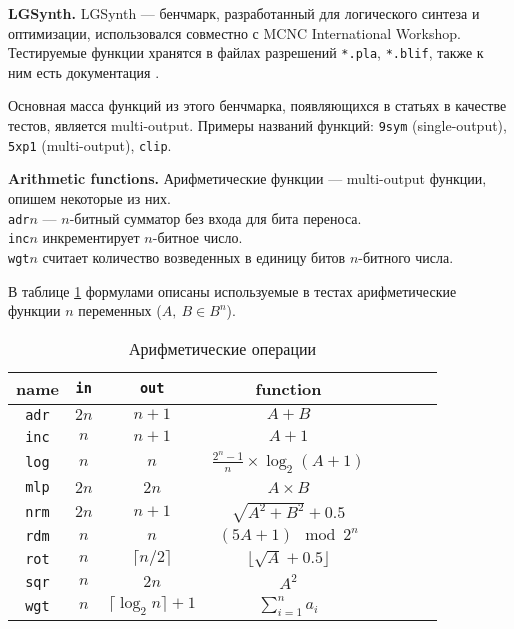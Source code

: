\documentclass[a4paper,12pt,titlepage,finall]{article}
\begin{document}
\textbf{LGSynth.}
LGSynth --- бенчмарк, разработанный для логического синтеза и оптимизации, использовался совместно с MCNC International Workshop. Тестируемые функции хранятся в файлах разрешений \texttt{*.pla}, \texttt{*.blif}, также к ним есть документация \cite{benchmark}.

Основная масса функций из этого бенчмарка, появляющихся в статьях в качестве тестов, является multi-output. Примеры названий функций: \texttt{9sym} (single-output), \texttt{5xp1} (multi-output), \texttt{clip}.

\textbf{Arithmetic functions.}
Арифметические функции --- multi-output функции, опишем некоторые из них.\\
\texttt{adr}$ n $ --- $ n $-битный сумматор без входа для бита переноса.\\
\texttt{inc}$ n $ инкрементирует $ n $-битное число.\\
\texttt{wgt}$ n $ считает количество возведенных в единицу битов $ n $-битного числа.

В таблице \ref{table_arithmetic} формулами описаны используемые в тестах арифметические функции $ n $ переменных ($ A,\ B \in B^n $).

\begin{table}[h!]
\centering
\begin{tabular}{ |c||c|c||c|c|c|c|c| }
\hline
\textbf{name}   & \texttt{\bf in} & \texttt{\bf out}    & \textbf{function} \\
\hline\hline
\texttt{adr} & $ 2 n $ & $ n + 1 $                      & $ A + B $ \\
\hline
\texttt{inc} & $ n $   & $ n + 1 $                      & $ A + 1 $ \\
\hline
\texttt{log} & $ n $   & $ n $                          & $ \frac{2^n - 1}{n} \times \log_2 (A + 1) $ \\
\hline
\texttt{mlp} & $ 2 n $ & $ 2 n $                        & $ A \times B $ \\
\hline
\texttt{nrm} & $ 2 n $ & $ n + 1 $                      & $ \sqrt{A^2 + B^2} + 0.5 $ \\
\hline
\texttt{rdm} & $ n $   & $ n $                          & $ (5 A + 1) \mod 2^n $ \\
\hline
\texttt{rot} & $ n $   & $ \lceil n / 2 \rceil $        & $ \lfloor \sqrt{A} + 0.5 \rfloor $ \\
\hline
\texttt{sqr} & $ n $   & $ 2 n $                        & $ A^2 $ \\
\hline
\texttt{wgt} & $ n $   & $ \lceil \log_2 n \rceil + 1 $ & $ \sum\limits_{i = 1}^n a_i $ \\
\hline
\end{tabular}
\caption{Арифметические операции}
\label{table_arithmetic}
\end{table}
\end{document}
